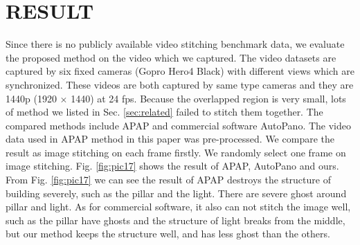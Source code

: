 \documentclass[conference]{IEEEtran}
\begin{document}
\section{RESULT}
\label{sec:result}

Since there is no publicly available video stitching benchmark data, we evaluate the proposed method on the 
video which we captured.  The video datasets are captured by six fixed cameras (Gopro Hero4 Black) with different views which are synchronized. 
These videos are both captured by same type cameras and they are 1440p (1920 $\times$ 1440) at 24 fps.
Because the overlapped region is very small, lots of method we listed in Sec. \ref{sec:related} failed to stitch them together.
The compared methods include APAP and commercial software AutoPano. The video data used in APAP method in this paper was pre-processed. We compare the result as image stitching on each frame firstly.
We randomly select one frame on image stitching. Fig. \ref{fig:pic17} shows the result of APAP, AutoPano and ours. 
From Fig. \ref{fig:pic17} we can see the result of APAP 
destroys the structure of building severely, such as the pillar and the light. There are severe ghost around pillar and light.
As for commercial software, it also can not stitch the image well, such as the pillar have ghosts and the structure of light breaks from the middle, 
but our method keeps the structure well, and has less ghost than the others.
\end{document}
